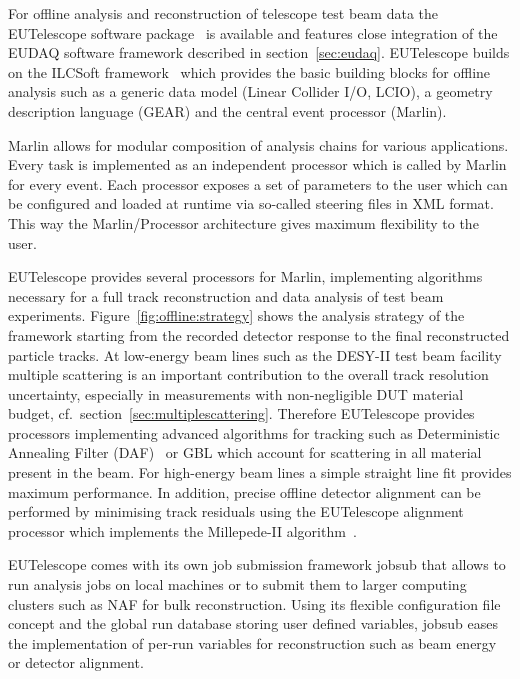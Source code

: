 

For offline analysis and reconstruction of telescope test beam data the EUTelescope software package~\cite{ref:eutelwebsite}
 is available and features close integration of the EUDAQ software framework described in section~\ref{sec:eudaq}.
EUTelescope builds on the ILCSoft framework~\cite{ref:eudetmemo_2009_12} which provides the basic building blocks for offline analysis such as a generic data model (Linear Collider I/O, LCIO),
a geometry description language (GEAR) and the central event processor (Marlin).

Marlin allows for modular composition of analysis chains for various applications. Every task is implemented as an independent processor which is called by Marlin for every event. 
Each processor exposes a set of parameters to the user which can be configured and loaded at runtime via so-called steering files in XML format.
This way the Marlin/Processor architecture gives maximum flexibility to the user.

EUTelescope provides several processors for Marlin, implementing algorithms necessary for a full track reconstruction and data analysis of test beam experiments. 
Figure~\ref{fig:offline:strategy} shows the analysis strategy of the framework starting from the recorded detector response to the final reconstructed particle tracks. 
At low-energy beam lines such as the DESY-II test beam facility multiple scattering is an important contribution to the overall track resolution uncertainty,
 especially in measurements with non-negligible DUT material budget, cf.\ section~\ref{sec:multiplescattering}.
Therefore EUTelescope provides processors implementing advanced algorithms for tracking such as Deterministic Annealing Filter (DAF)~\cite{ref:daffitter}
 or GBL which account for scattering in all material present in the beam.
For high-energy beam lines a simple straight line fit provides maximum performance.
In addition, precise offline detector alignment can be performed by minimising track residuals using the EUTelescope alignment processor which implements the Millepede-II algorithm~\cite{Blobel-2006}.

EUTelescope comes with its own job submission framework jobsub that allows to run analysis jobs on local machines or to submit them to larger computing clusters such as NAF for bulk reconstruction.
Using its flexible configuration file concept and the global run database storing user defined variables,
 jobsub eases the implementation of per-run variables for reconstruction such as beam energy or detector alignment.

